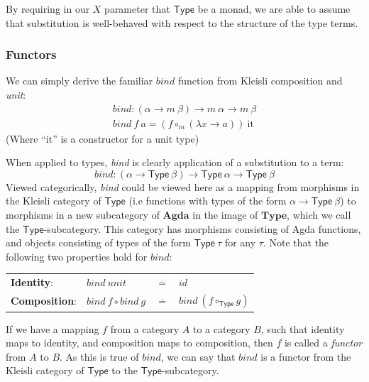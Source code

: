 \documentclass[a4paper]{jfp}
\begin{document}
By requiring in our $X$ parameter that $\textsf{Type}$ be a monad, we are able to assume that substitution is well-behaved with respect to the
structure of the type terms. 

\subsubsection{Functors}

We can simply derive the familiar $\mathit{bind}$ function from Kleisli composition and \emph{unit}:
\begin{displaymath}
   \begin{array}{ll}
	\mathit{bind} : (\alpha \rightarrow m\ \beta) \rightarrow m\ \alpha \rightarrow m\ \beta \\
   \mathit{bind}\ f\ a = (f \circ_m (\lambda x \rightarrow a))\ \text{it}
   \end{array}
\end{displaymath}
(Where ``$\text{it}$'' is a constructor for a unit type)

When applied to types, \emph{bind} is clearly application of a substitution to a term:
\begin{displaymath}
	\mathit{bind} :  (\alpha \rightarrow \textsf{Type}\ \beta) \rightarrow \textsf{Type}\ \alpha \rightarrow \textsf{Type}\ \beta
\end{displaymath}
Viewed categorically, \emph{bind} could be viewed here as a mapping from morphisms in the Kleisli category of $\textsf{Type}$ (i.e functions with
types of the form $\alpha \rightarrow \textsf{Type}\ \beta$) to morphisms in a new subcategory of $\textbf{Agda}$ in the image of $\textbf{Type}$,
which we call the $\textsf{Type}$-subcategory. This category has morphisms consisting of Agda functions, and objects consisting of types of the form
$\textsf{Type}\ \tau$ for any $\tau$. Note that the following two properties hold for $\mathit{bind}$:

\begin{tabular}{llll}
      \textbf{Identity}: & $\mathit{bind}\ \mathit{unit} $&$\stackrel{\cdot}{=}$&$ \mathit{id}$\\
      \textbf{Composition}:& $\mathit{bind}\ f \circ \mathit{bind}\ g $&$\stackrel{\cdot}{=}$&$ \mathit{bind}\ (f \circ_\textsf{Type} g)$\\
\end{tabular}

If we have a mapping $f$ from a category $A$ to a category $B$, such that identity maps to identity, and composition maps to composition, 
then $f$ is called a \emph{functor} from $A$ to $B$. As this is true of $\mathit{bind}$, we can say that $\mathit{bind}$ is a functor from the Kleisli
category of $\textsf{Type}$ to the $\textsf{Type}$-subcategory. 
\end{document}
